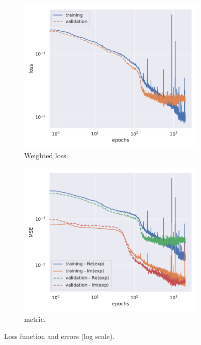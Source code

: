 \begin{figure}[htbp]
  \centering
  \begin{subfigure}{0.45\textwidth}
    \centering
    \includegraphics[width=\linewidth]{img/loss}
    \caption{Weighted loss.}
  \end{subfigure}
  \begin{subfigure}{0.45\textwidth}
    \centering
    \includegraphics[width=\linewidth]{img/mse}
    \caption{\mse metric.}
  \end{subfigure}
  \caption{Loss function and errors (log scale).}
  \label{fig:agg:err}
\end{figure}


